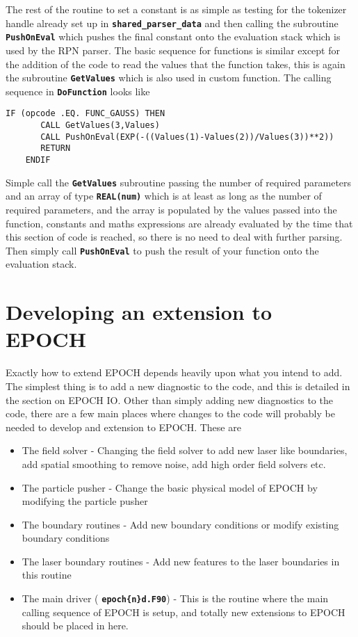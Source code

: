 \documentclass[12pt]{article}
\newcommand{\simpleboxverbatim}{\begin{Verbatim}[obeytabs=true,frame=single,
  framerule=0.5mm,rulecolor=\color{warwickmid}]}
\newcommand{\inlinecode}[1]{{\color{warwickred} \bf\texttt{#1}}}
\newcommand{\nEPOCH}{{\color{warwickdark}\fontfamily{phv}\selectfont EPOCH}}
\newcommand{\EPOCH}{{\nEPOCH} }
\begin{document}
The rest of the routine to set a constant is as simple as testing for the
tokenizer handle already set up in \inlinecode{shared\_parser\_data} and then
calling the subroutine \inlinecode{PushOnEval} which pushes the final constant
onto the evaluation stack which is used by the RPN parser. The basic sequence
for functions is similar except for the addition of the code to read the values
that the function takes, this is again the subroutine \inlinecode{GetValues}
which is also used in custom function. The calling sequence in
\inlinecode{DoFunction} looks like

\simpleboxverbatim
    IF (opcode .EQ. FUNC_GAUSS) THEN
       CALL GetValues(3,Values)
       CALL PushOnEval(EXP(-((Values(1)-Values(2))/Values(3))**2))
       RETURN
    ENDIF
\end{Verbatim}
Simple call the \inlinecode{GetValues} subroutine passing the number of
required parameters and an array of type \inlinecode{REAL(num)} which is at
least as long as the number of required parameters, and the array is populated
by the values passed into the function, constants and maths expressions are
already evaluated by the time that this section of code is reached, so there is
no need to deal with further parsing. Then simply call \inlinecode{PushOnEval}
to push the result of your function onto the evaluation stack.

\section{Developing an extension to \EPOCH}

Exactly how to extend \EPOCH depends heavily upon what you intend to add. The
simplest thing is to add a new diagnostic to the code, and this is detailed in
the section on \EPOCH IO. Other than simply adding new diagnostics to the code,
there are a few main places where changes to the code will probably be needed
to develop and extension to \nEPOCH. These are
\begin{itemize}
\item The field solver - Changing the field solver to add new laser like
  boundaries, add spatial smoothing to remove noise, add high order field
  solvers etc.
\item The particle pusher - Change the basic physical model of \EPOCH by
  modifying the particle pusher
\item The boundary routines - Add new boundary conditions or modify existing
  boundary conditions
\item The laser boundary routines - Add new features to the laser boundaries in
  this routine
\item The main driver (\inlinecode{epoch\{n\}d.F90}) - This is the routine
  where the main calling sequence of \EPOCH is setup, and totally new
  extensions to \EPOCH should be placed in here.
\end{itemize}
\end{document}
